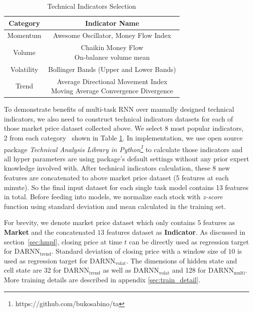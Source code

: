 \documentclass[sigconf]{acmart}
\renewcommand{\cite}{\citep}
\begin{document}
\begin{table}[H]
\centering
\small
\caption{Technical Indicators Selection}
\begin{tabular}{|c|c|} \hline
  Category&Indicator Name\\ \hline
  Momentum& Awesome Oscillator, Money Flow Index\\ \hline
  Volume& \makecell{Chaikin Money Flow\\ On-balance volume mean}\\ \hline
  Volatility& Bollinger Bands (Upper and Lower Bands)\\ \hline
  Trend& \makecell{Average Directional Movement Index\\Moving Average Convergence Divergence}\\ \hline
\end{tabular}
  \label{tab:ta}
\end{table}

To demonstrate benefits of multi-task RNN over manually designed
technical indicators, we also need to construct technical
indicators datasets for each of those market price dataset
collected above. We select 8 most popular indicators, 2 from each
category~\cite{kirkpatrick2010technical} shown in Table
\ref{tab:ta}. In implementation, we use open source package
\emph{Technical Analysis Library in
  Python\footnote{https://github.com/bukosabino/ta}} to calculate
those indicators and all hyper parameters are using package's
default settings without any prior expert knowledge involved
with. After technical indicators calculation, these 8 new
features are concatenated to above market price dataset (5
features at each minute). So the final input dataset for each
single task model contains 13 features in total. Before feeding
into models, we normalize each stock with \emph{z-score} function
using standard deviation and mean calculated in the training set.

For brevity, we denote market price dataset which only contains
$5$ features as \textbf{Market} and the concatenated $13$
features dataset as \textbf{Indicator}. As discussed in
section~\ref{sec:hmpl}, closing price at time $t$ can be directly
used as regression target for $\text{DARNN}_{\text{trend}}$.
Standard deviation of closing price with a window size of $10$ is
used as regression target for $\text{DARNN}_{\text{volat}}$. The
dimensions of hidden state and cell state are 32 for
$\text{DARNN}_{\text{trend}}$ as well as
$\text{DARNN}_{\text{volat}}$ and 128 for
$\text{DARNN}_{\text{multi}}$. More training details are
described in appendix \ref{sec:train_detail}.
\end{document}
